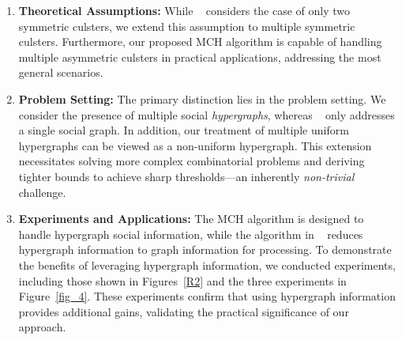 \documentclass{article}
\begin{document}
\begin{enumerate}
    \item \textbf{Theoretical Assumptions:} While ~\cite{ahn2018binary} considers the case of only two symmetric culsters, we extend this assumption to multiple symmetric culsters. Furthermore, our proposed MCH algorithm is capable of handling multiple asymmetric culsters in practical applications, addressing the most general scenarios.
    \item \textbf{Problem Setting:} The primary distinction lies in the problem setting. We consider the presence of multiple social \textit{hypergraphs}, whereas ~\cite{ahn2018binary} only addresses a single social graph. In addition, our treatment of multiple uniform hypergraphs can be viewed as a non-uniform hypergraph. This extension necessitates solving more complex combinatorial problems and deriving tighter bounds to achieve sharp thresholds—an inherently \textit{non-trivial} challenge.
    \item \textbf{Experiments and Applications:} The MCH algorithm is designed to handle hypergraph social information, while the algorithm in ~\cite{ahn2018binary} reduces hypergraph information to graph information for processing. To demonstrate the benefits of leveraging hypergraph information, we conducted experiments, including those shown in Figures~\ref{R2} and the three experiments in Figure~\ref{fig_4}. These experiments confirm that using hypergraph information provides additional gains, validating the practical significance of our approach.  
\end{enumerate}


\medskip
\end{document}
